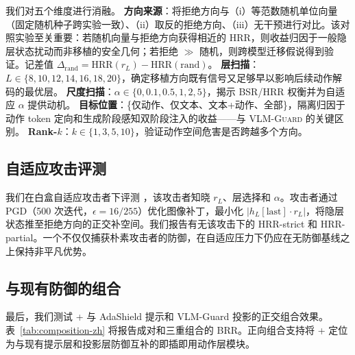 我们对五个维度进行消融。
\textbf{方向来源}：将拒绝方向与（i）等范数随机单位向量（固定随机种子跨实验一致）、（ii）取反的拒绝方向、（iii）无干预进行对比。该对照实验至关重要：若随机向量与拒绝方向获得相近的 HRR，则收益归因于一般隐层状态扰动而非移植的安全几何；若拒绝 $\gg$ 随机，则跨模型迁移假说得到验证。记差值 $\Delta_{\text{rand}}=\mathrm{HRR}(r_L) - \mathrm{HRR}(\text{rand})$。
\textbf{层扫描}：$L \in \{8, 10, 12, 14, 16, 18, 20\}$，确定移植方向既有信号又足够早以影响后续动作解码的最优层。
\textbf{尺度扫描}：$\alpha \in \{0, 0.1, 0.5, 1, 2, 5\}$，揭示 BSR/HRR 权衡并为自适应 $\alpha$ 提供动机。
\textbf{目标位置}：\{仅动作、仅文本、文本+动作、全部\}，隔离归因于动作 token 定向和生成阶段感知双阶段注入的收益——与 \textsc{VLM-Guard} 的关键区别。
\textbf{Rank-$k$}：$k \in \{1, 3, 5, 10\}$，验证动作空间危害是否跨越多个方向。

\begin{table}[t]
\centering\small
{}
\caption{消融扫描。$\Delta_{\text{rand}}$ 列报告拒绝$-$随机 HRR 差值，正值确认跨模型几何是有效成分。}
\label{tab:ablations-zh}
\end{table}

\subsection{自适应攻击评测}
\label{sec:exp:adaptive}

我们在白盒自适应攻击者下评测 \method{}，该攻击者知晓 $r_L$、层选择和 $\alpha$。攻击者通过 PGD（500 次迭代，$\epsilon=16/255$）优化图像补丁，最小化 $|h_L[\text{last}] \cdot r_L|$，将隐层状态推至拒绝方向的正交补空间。我们报告有无该攻击下的 HRR-strict 和 HRR-partial。一个不仅仅捕获朴素攻击者的防御，在自适应压力下仍应在无防御基线之上保持非平凡优势。

\subsection{与现有防御的组合}
\label{sec:exp:composition}

最后，我们测试 \method{}+ 与 AdaShield 提示和 VLM-Guard 投影的正交组合效果。表~\ref{tab:composition-zh} 将报告成对和三重组合的 BRR。正向组合支持将 \method{}+ 定位为与现有提示层和投影层防御互补的即插即用动作层模块。

\begin{table}[t]
\centering\small
{}
\caption{\method{}+ 与现有防御的组合效果。}
\label{tab:composition-zh}
\end{table}
